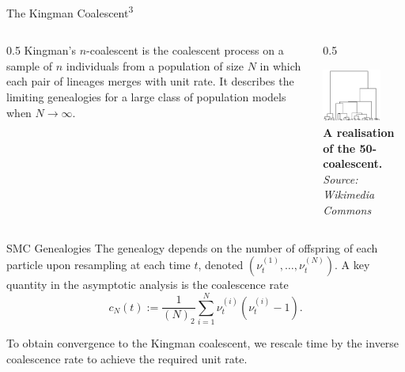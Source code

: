 \documentclass[final, 12pt]{beamer}
\newlength{\colwidth}
\newcommand{\vt}[2][t]{\nu_{#1}^{(#2)}}
\begin{document}
\begin{frame}
\begin{columns}
\begin{column}{\colwidth}
\begin{block}{The Kingman Coalescent\textsuperscript{3}}
\begin{columns}
\begin{column}{0.5\colwidth}
Kingman's $n$-coalescent is the coalescent process on a sample of $n$ individuals from a population of size $N$ in which each pair of lineages merges with unit rate.
It describes the limiting genealogies for a large class of population models when $N\to\infty$.
\end{column}
\begin{column}{0.5\colwidth}
\begin{center}
\includegraphics[width=0.7\textwidth]{../kingman.png}\\
\small{
\textbf{A realisation of the 50-coalescent.}
\textit{Source: Wikimedia Commons}
}
\end{center}
\end{column}
\end{columns}
\end{block}

\begin{block}{SMC Genealogies}
The genealogy depends on the number of offspring of each particle upon resampling at each time $t$, denoted $(\vt{1}, \dots, \vt{N})$.
A key quantity in the asymptotic analysis is the coalescence rate
\begin{equation*}
c_N(t) := \frac{1}{(N)_2} \sum_{i=1}^{N} \vt{i}(\vt{i}-1).
\end{equation*}

To obtain convergence to the Kingman coalescent, we rescale time by the inverse coalescence rate to achieve the required unit rate.\\[16pt]


\end{block}
\end{column}
\end{columns}
\end{frame}
\end{document}
